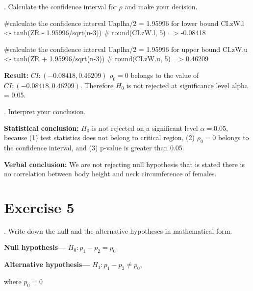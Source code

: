 \documentclass[12pt, oneside]{report}\usepackage[]{graphicx}\usepackage[]{color}
\begin{document}
. Calculate the confidence interval for $\rho$ and make your decision.
\begin{Schunk}
\begin{Sinput}
#calculate the confidence interval Uaplha/2 = 1.95996 for lower bound
CI.zW.l <- tanh(ZR - 1.95996/sqrt(n-3))
# round(CI.zW.l, 5) => -0.08418

#calculate the confidence interval Uaplha/2 = 1.95996 for upper bound
CI.zW.u <- tanh(ZR + 1.95996/sqrt(n-3))
# round(CI.zW.u, 5) => 0.46209
\end{Sinput}
\end{Schunk}
{\bf Result:} $CI: (-0.08418, 0.46209)$ \newline
$\rho_0 = 0$ belongs to the value of $CI: (-0.08418, 0.46209)$. Therefore $H_0$ is not rejected at significance level alpha = 0.05. \newline

. Interpret your conclusion. \newline

{\bf Statistical conclusion:} \newline
$H_0$ is not rejected on a significant level $\alpha = 0.05$, because (1) test statistics does not belong to critical region, (2) $\rho_0 = 0$ belongs to the confidence interval, and (3) p-value is greater than 0.05. \newline 

{\bf Verbal conclusion:} \newline
We are not rejecting null hypothesis that is stated there is no correlation between body height and neck circumference of females. \newline

\section*{Exercise 5}
. Write down the null and the alternative hypotheses in mathematical form. \newline

{\bf Null hypothesis—} $H_0: p_1 - p_2 = p_0$ \newline

{\bf Alternative hypothesis—} $H_1: p_1 - p_2 \neq p_0$, \newline

where $p_0 = 0$\newline
\end{document}
